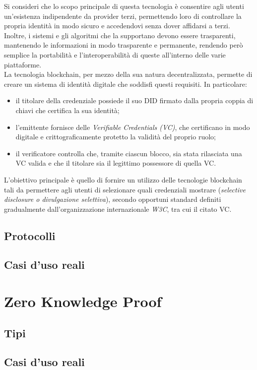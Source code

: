 Si consideri che lo scopo principale di questa tecnologia è consentire agli utenti un'esistenza indipendente da provider terzi, 
permettendo loro di controllare la propria identità in modo sicuro e accedendovi senza dover affidarsi a terzi. \\
Inoltre, i sistemi e gli algoritmi che la supportano devono essere trasparenti, mantenendo le informazioni in modo trasparente e permanente, rendendo però semplice 
la portabilità e l'interoperabilità di queste all'interno delle varie piattaforme. \\

La tecnologia blockchain, per mezzo della sua natura decentralizzata, permette di creare un sistema di identità digitale che soddisfi questi requisiti.
In particolare:
\begin{itemize}
    \item il titolare della credenziale possiede il suo DID firmato dalla propria coppia di chiavi che certifica la sua identità;
    \item l'emittente fornisce delle \textit{Verifiable Credentials (VC)}, che certificano in modo digitale e crittograficamente protetto la validità del proprio ruolo;
    \item il verificatore controlla che, tramite ciascun blocco, sia stata rilasciata una VC valida e che il titolare sia il legittimo possessore di quella VC.
\end{itemize}  

L'obiettivo principale è quello di fornire un utilizzo delle tecnologie blockchain tali da permettere agli utenti di selezionare quali credenziali mostrare (\textit{selective disclosure o divulgazione selettiva}),
secondo opportuni standard definiti gradualmente dall'organizzazione internazionale \textit{W3C}, tra cui il citato VC. \\

\subsection{Protocolli}\label{sec:self-sovereign-identity-protocolli}
\subsection{Casi d'uso reali}\label{sec:self-sovereign-identity-casiduso}

\section{Zero Knowledge Proof}\label{sec:zero-knowledge-proof}

\subsection{Tipi}\label{sec:zero-knowledge-proof-tipi}
\subsection{Casi d'uso reali}\label{sec:zero-knowledge-proof-casiduso}

